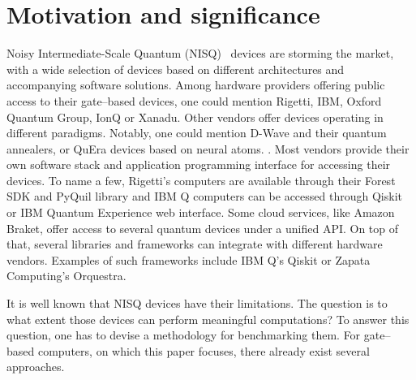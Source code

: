 \documentclass[preprint,12pt, a4paper, dvipsnames]{elsarticle}
\newcommand{\1}{{\rm 1\hspace{-0.9mm}l}}
\begin{document}
\section{Motivation and significance}

Noisy Intermediate-Scale Quantum (NISQ)~\cite{preskill} devices are storming the market,
with a wide selection of devices based on different architectures and accompanying software
solutions. Among hardware providers offering public access to their gate--based devices, one could
mention Rigetti, IBM, Oxford Quantum Group, IonQ or Xanadu. Other vendors offer devices operating in
different paradigms. Notably, one could mention D-Wave and their quantum
annealers, or QuEra devices based on neural atoms. . Most vendors provide their own software stack and
application programming interface for accessing their devices. To name a few, Rigetti's computers
are available through their Forest SDK and PyQuil library and IBM Q computers can be accessed
through Qiskit or IBM Quantum Experience web interface. Some cloud services, like Amazon Braket, offer access to several quantum devices under a unified API. On top of that, several
libraries and frameworks can integrate with different hardware vendors. Examples of such frameworks
include IBM Q's Qiskit or Zapata Computing's Orquestra.

It is well known that NISQ devices have their limitations. The question is to what extent those
devices can perform meaningful computations? To answer this question, one has to devise a
methodology for benchmarking them. For gate--based computers, on which this paper focuses, there
already exist several approaches.  
\end{document}
